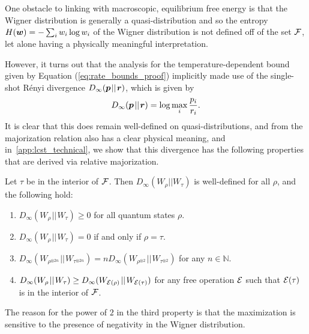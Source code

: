 \documentclass[pra,
aps,
twocolumn,
superscriptaddress,
groupedaddress,
nofootinbib,
reprint
]{revtex4-1}
\begin{document}
One obstacle to linking with macroscopic, equilibrium free energy is that the Wigner distribution is generally a quasi-distribution and so the entropy $H(\boldsymbol{w}) = -\sum_i w_i \log w_i$ of the Wigner distribution is not defined off of the set ${\mathcal F}$, let alone having a physically meaningful interpretation. 



 
However, it turns out that the analysis for the temperature-dependent bound given by Equation (\ref{eq:rate_bounds_proof}) implicitly made use of the single-shot R\'{e}nyi divergence $D_\infty (\boldsymbol{p} \hspace{1pt}||\hspace{1pt} \boldsymbol{r})$, which is given by
\begin{equation}
	D_\infty (\boldsymbol{p} \hspace{1pt}||\hspace{1pt} \boldsymbol{r}) = \log \max_i \frac{p_i}{r_i}.
\end{equation}
It is clear that this does remain well-defined on quasi-distributions, and from the majorization relation also has a clear physical meaning, and in~\cref{app:lcst_technical}, we show that this divergence has the following properties that are derived via relative majorization.
\begin{theorem}\label{thm:Dinfty} 
	Let $\tau$ be in the interior of ${\mathcal F}$. Then $D_\infty(W_\rho || W_\tau)$ is well-defined for all $\rho$, and the following hold:
\begin{enumerate}
\item $D_\infty(W_\rho \hspace{1pt}||\hspace{1pt} W_\tau) \ge 0$ for all quantum states $\rho$.
\item  $D_\infty(W_\rho \hspace{1pt}||\hspace{1pt} W_\tau) = 0$ if and only if $\rho =\tau$.
\item $D_\infty(W_{\rho^{\otimes 2n}} \hspace{1pt}||\hspace{1pt} W_{\tau^{\otimes 2n}}) = n D_\infty(W_{\rho^{\otimes 2}} \hspace{1pt}||\hspace{1pt} W_{\tau^{\otimes 2}})$ for any $n \in \mathbb{N}$.
\item $D_\infty(W_\rho \hspace{1pt}||\hspace{1pt} W_\tau) \geq D_\infty(W_{{\mathcal E}(\rho)} \hspace{1pt}||\hspace{1pt} W_{{\mathcal E}(\tau)})$ for any free operation ${\mathcal E}$ such that ${\mathcal E}(\tau)$ is in the interior of ${\mathcal F}$.
\end{enumerate}
\end{theorem}
The reason for the power of $2$ in the third property is that the maximization is sensitive to the presence of negativity in the Wigner distribution.
\end{document}
